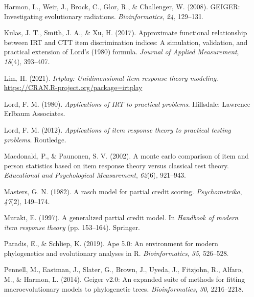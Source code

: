 \documentclass[
  man]{apa6}
\newlength{\cslhangindent}
\newlength{\cslentryspacingunit} %
\newenvironment{CSLReferences}[2] %
 {%
  \setlength{\parindent}{0pt}
  \ifodd #1
  \let\oldpar\par
  \def\par{\hangindent=\cslhangindent\oldpar}
  \fi
  \setlength{\parskip}{#2\cslentryspacingunit}
 }%
 {}
\begin{document}
\begin{CSLReferences}{1}{0}
\leavevmode{}%
Harmon, L., Weir, J., Brock, C., Glor, R., \& Challenger, W. (2008). GEIGER: Investigating evolutionary radiations. \emph{Bioinformatics}, \emph{24}, 129--131.

\leavevmode{}%
Kulas, J. T., Smith, J. A., \& Xu, H. (2017). Approximate functional relationship between IRT and CTT item discrimination indices: A simulation, validation, and practical extension of {Lord's} (1980) formula. \emph{Journal of Applied Measurement}, \emph{18}(4), 393--407.

\leavevmode{}%
Lim, H. (2021). \emph{Irtplay: Unidimensional item response theory modeling}. \url{https://CRAN.R-project.org/package=irtplay}

\leavevmode{}%
Lord, F. M. (1980). \emph{Applications of IRT to practical problems}. Hillsdale: Lawrence Erlbaum Associates.

\leavevmode{}%
Lord, F. M. (2012). \emph{Applications of item response theory to practical testing problems}. Routledge.

\leavevmode{}%
Macdonald, P., \& Paunonen, S. V. (2002). A monte carlo comparison of item and person statistics based on item response theory versus classical test theory. \emph{Educational and Psychological Measurement}, \emph{62}(6), 921--943.

\leavevmode{}%
Masters, G. N. (1982). A rasch model for partial credit scoring. \emph{Psychometrika}, \emph{47}(2), 149--174.

\leavevmode{}%
Muraki, E. (1997). A generalized partial credit model. In \emph{Handbook of modern item response theory} (pp. 153--164). Springer.

\leavevmode{}%
Paradis, E., \& Schliep, K. (2019). Ape 5.0: An environment for modern phylogenetics and evolutionary analyses in {R}. \emph{Bioinformatics}, \emph{35}, 526--528.

\leavevmode{}%
Pennell, M., Eastman, J., Slater, G., Brown, J., Uyeda, J., Fitzjohn, R., Alfaro, M., \& Harmon, L. (2014). Geiger v2.0: An expanded suite of methods for fitting macroevolutionary models to phylogenetic trees. \emph{Bioinformatics}, \emph{30}, 2216--2218.


\end{CSLReferences}
\end{document}
